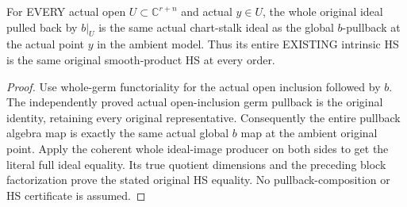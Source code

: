 \begin{lemma}
\label{hir:actual-open-block-projection-entire-original-stalk}
\leanok
For EVERY actual open $U\subset\mathbb C^{r+n}$ and actual $y\in U$, the
whole original ideal pulled back by $b|_U$ is the same actual chart-stalk
ideal as the global $b$-pullback at the actual point $y$ in the ambient
model. Thus its entire EXISTING intrinsic HS is the same original
smooth-product HS at every order.
\end{lemma}
\begin{proof}
Use whole-germ functoriality for the actual open inclusion followed by
$b$. The independently proved actual open-inclusion germ pullback is the
original identity, retaining every original representative. Consequently
the entire pullback algebra map is exactly the same actual global $b$
map at the ambient original point. Apply the coherent whole ideal-image
producer on both sides to get the literal full ideal equality. Its true
quotient dimensions and the preceding block factorization prove the stated
original HS equality. No pullback-composition or HS certificate is assumed.
\end{proof}

